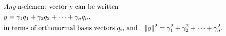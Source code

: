\documentclass[convert={density=300,outext=.png}]{standalone}
\begin{document}
\begin{minipage}[t]{0.3\textwidth}
\begin{align*}
&\mbox{{\it Any} n-element vector y can be written}\\
&y = \gamma_1 q_1 + \gamma_2 q_2 + \cdots + \gamma_n q_n,\\
&\mbox{in terms of orthonormal basis vectors $q_i$, and}
&\|y\|^2 = \gamma_1^2 + \gamma_2^2 + \cdots + \gamma_n^2.
\end{align*}
\end{minipage}
\end{document}
